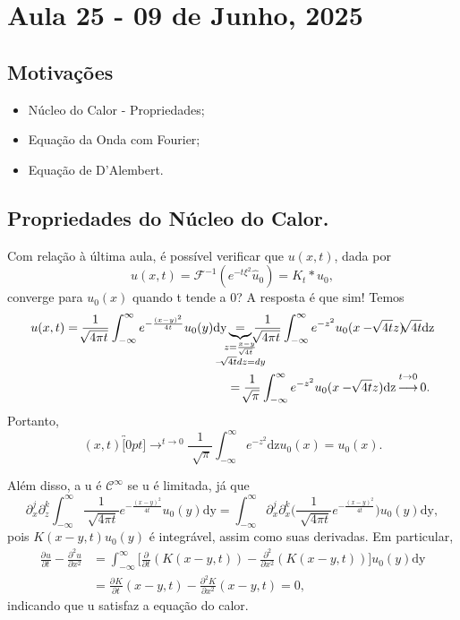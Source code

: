 \documentclass[../pde_notes.tex]{subfiles}
\begin{document}
\section{Aula 25 - 09 de Junho, 2025}
\subsection{Motivações}
\begin{itemize}
	\item Núcleo do Calor - Propriedades;
	\item Equação da Onda com Fourier;
	\item Equação de D'Alembert.
\end{itemize}
\subsection{Propriedades do Núcleo do Calor.}
Com relação à última aula, é possível verificar que \(u(x, t)\), dada por
\[
	u(x, t) = \mathcal{F}^{-1}(e^{-t\xi^{2}}\hat{u}_{0}) = K_{t}*u_{0},
\]
converge para \(u_{0}(x)\) quando t tende a 0? A resposta é que sim! Temos
\begin{align*}
	u(x, t) = \frac{1}{\sqrt[]{4\pi t}}\int_{-\infty}^{\infty}e^{-\frac{(x-y)^{2}}{4t}}u_{0}(y) \mathrm{dy} & \underbrace{=}_{\mathclap{\substack{z=\frac{x-y}{\sqrt[]{4t}}                                                                             \\ -\sqrt[]{4t}dz = dy}}} \frac{1}{\sqrt[]{4\pi t}}\int_{-\infty}^{\infty}e^{-z^{2}}u_{0}(x-\sqrt[]{4t}z)\sqrt[]{4t} \mathrm{dz}\\
	                                                                                                        & = \frac{1}{\sqrt[]{\pi }}\int_{-\infty}^{\infty}e^{-z^{2}}u_{0}(x-\sqrt[]{4t}z) \mathrm{dz} \overbracket[0pt]{\longrightarrow}^{t\to 0}0.
\end{align*}
Portanto,
\[
	(x, t) \overbracket[0pt]{\rightarrow}^{t\to 0} \frac{1}{\sqrt[]{\pi }}\int_{-\infty}^{\infty}e^{-z^{2}}\mathrm{dz}u_{0}(x) = u_{0}(x).
\]

Além disso, a u é \(\mathcal{C}^{\infty}\) se u é limitada, já que
\[
	\partial_{x}^{j}\partial_{z}^{k}\int_{-\infty}^{\infty}\frac{1}{\sqrt[]{4\pi t}}e^{-\frac{(x-y)^{2}}{4t}}u_{0}(y) \mathrm{dy} = \int_{-\infty}^{\infty}\partial_{x}^{j}\partial_{x}^{k}\biggl(\frac{1}{\sqrt[]{4\pi t}}e^{-\frac{(x-y)^{2}}{4t}}\biggr)u_{0}(y) \mathrm{dy},
\]
pois \(K(x-y, t)u_{0}(y)\) é integrável, assim como suas derivadas. Em particular,
\begin{align*}
	\frac{\partial^{}u}{\partial t^{}} - \frac{\partial^{2}u}{\partial x^{2}} & = \int_{-\infty}^{\infty}\biggl[\frac{\partial^{}}{\partial t^{}}(K(x-y, t))-\frac{\partial^{2}}{\partial x^{2}}(K(x-y, t))\biggr]u_{0}(y) \mathrm{dy} \\
	                                                                          & = \frac{\partial^{}K}{\partial t^{}}(x-y, t) - \frac{\partial^{2}K}{\partial x^{2}}(x-y, t) = 0,
\end{align*}
indicando que u satisfaz a equação do calor.
\end{document}
